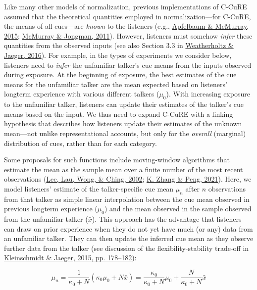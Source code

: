 \documentclass[
  11pt,
  english,
  man,floatsintext]{apa6}
\begin{document}
Like many other models of normalization, previous implementations of C-CuRE assumed that the theoretical quantities employed in normalization---for C-CuRE, the means of all cues---are \emph{known} to the listeners (e.g., \protect\hyperlink{ref-apfelbaum-mcmurray2015}{Apfelbaum \& McMurray, 2015}; \protect\hyperlink{ref-mcmurray-jongman2011}{McMurray \& Jongman, 2011}). However, listeners must somehow \emph{infer} these quantities from the observed inputs (see also Section 3.3 in \protect\hyperlink{ref-weatherholtz-jaeger2016}{Weatherholtz \& Jaeger, 2016}). For example, in the types of experiments we consider below, listeners need to \emph{infer} the unfamiliar talker's cue means from the inputs observed during exposure. At the beginning of exposure, the best estimates of the cue means for the unfamiliar talker are the mean expected based on listeners' longterm experience with various different talkers (\(\mu_0\)). With increasing exposure to the unfamiliar talker, listeners can update their estimates of the talker's cue means based on the input. We thus need to expand C-CuRE with a linking hypothesis that describes how listeners update their estimates of the unknown mean---not unlike representational accounts, but only for the \emph{overall} (marginal) distribution of cues, rather than for each category.

Some proposals for such functions include moving-window algorithms that estimate the mean as the sample mean over a finite number of the most recent observations (\protect\hyperlink{ref-lee2002}{Lee, Lau, Wong, \& Ching, 2002}; \protect\hyperlink{ref-zhang-peng2021}{K. Zhang \& Peng, 2021}). Here, we model listeners' estimate of the talker-specific cue mean \(\mu_n\) after \(n\) observations from that talker as simple linear interpolation between the cue mean observed in previous longterm experience (\(\mu_0\)) and the mean observed in the sample observed from the unfamiliar talker (\(\bar{x}\)). This approach has the advantage that listeners can draw on prior experience when they do not yet have much (or any) data from an unfamiliar talker. They can then update the inferred cue mean as they observe further data from the talker (see discussion of the flexibility-stability trade-off in \protect\hyperlink{ref-kleinschmidt-jaeger2015}{Kleinschmidt \& Jaeger, 2015, pp. 178--182}):

\begin{equation}\label{eq:normalization-change}
\mu_n = \frac{1}{\kappa_0 + N} \left( \kappa_0 \mu_0 + N \bar{x} \right) = \frac{\kappa_0}{\kappa_0 + N} \mu_0 + \frac{N}{\kappa_0 + N}\bar{x} 
\end{equation}
\end{document}
